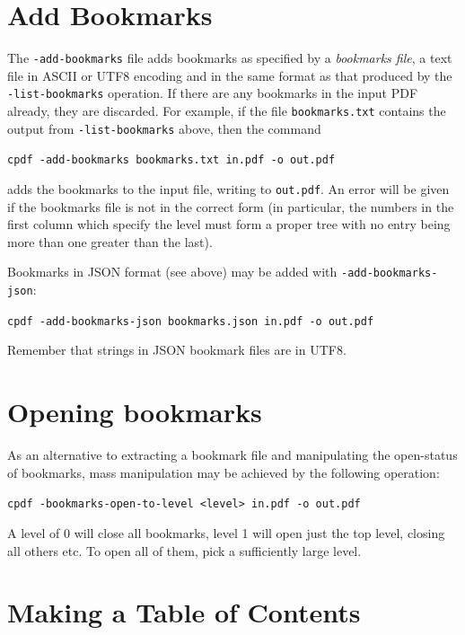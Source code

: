 \documentclass{book}
\begin{document}
  \section{Add Bookmarks}
  
  The \texttt{-add-bookmarks} file adds bookmarks as specified by a
\textit{bookmarks file}, a text file in ASCII or UTF8 encoding and in the same format as that produced by the
\texttt{-list-bookmarks} operation. If there are any bookmarks in the input PDF
already, they are discarded. For example, if the file \texttt{bookmarks.txt}
contains the output from \texttt{-list-bookmarks} above, then the command
  \begin{framed}
   \noindent\small\verb!cpdf -add-bookmarks bookmarks.txt in.pdf -o out.pdf!
  \end{framed}
\noindent adds the bookmarks to the input file, writing to \texttt{out.pdf}. An error
will be given if the bookmarks file is not in the correct form (in particular,
the numbers in the first column which specify the level must form a proper
tree with no entry being more than one greater than the last).

Bookmarks in JSON format (see above) may be added with \texttt{-add-bookmarks-json}:

  \begin{framed}
   \noindent\small\verb!cpdf -add-bookmarks-json bookmarks.json in.pdf -o out.pdf!
  \end{framed}

\noindent Remember that strings in JSON bookmark files are in UTF8.

\section{Opening bookmarks}
As an alternative to extracting a bookmark file and manipulating the open-status of bookmarks, mass manipulation may be achieved by the following operation:

  \begin{framed}
   \noindent\small\verb!cpdf -bookmarks-open-to-level <level> in.pdf -o out.pdf!
  \end{framed}

\noindent A level of 0 will close all bookmarks, level 1 will open just the top level, closing all others etc. To open all of them, pick a sufficiently large level.


\section{Making a Table of Contents}
\end{document}

